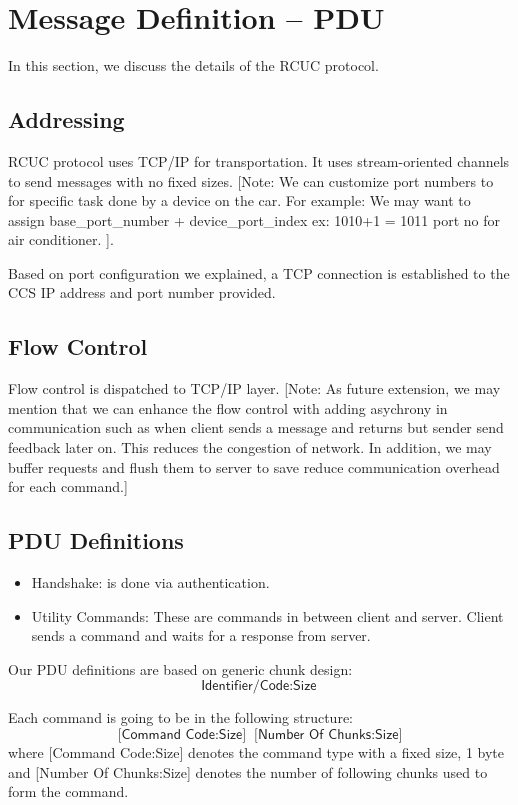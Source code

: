 \section{Message Definition -- PDU}
\label{sec:pdus}

In this section, we discuss the details of the \textsf{RCUC} protocol.

\subsection{Addressing}
\label{sec:pdus:addr}
\textsf{RCUC} protocol uses TCP/IP for transportation. It uses stream-oriented channels to send messages with no fixed sizes. [Note: We can customize port numbers to for specific task done by a device on the car. For example: We may want to assign base\_port\_number + device\_port\_index ex: 1010+1 = 1011 port no for air conditioner. ].

Based on port configuration we explained, a TCP connection is established to the \textsf{CCS} IP address and port number provided.
\subsection{Flow Control}
\label{sec:pdus:flow}
Flow control is dispatched to TCP/IP layer. [Note: As future extension, we may mention that we can enhance the flow control with adding asychrony in communication such as when client sends a message  and returns but sender send feedback later on. This reduces the congestion of network. In addition, we may buffer requests and flush them to server to save reduce communication overhead for each command.]
 
\subsection{PDU Definitions}
\label{sec:pdus:pdu}
\begin{itemize}
\item \textsf{Handshake}: is done via authentication.
\item \textsf{Utility Commands}: These are commands in between client and server. Client sends a command and waits for a response from server.
  \end{itemize}

Our PDU definitions are based on generic chunk design:
\[\textsf{Identifier/Code} : \textsf{Size}\]

Each command is going to be in the following structure:
\[\textsf{[Command Code:Size]} \;\; \textsf{[Number Of Chunks:Size]}\]
where \textsf{[Command Code:Size]} denotes the command type with a fixed size, 1 byte and \textsf{[Number Of Chunks:Size]} denotes the number of following chunks used to form the command. 
